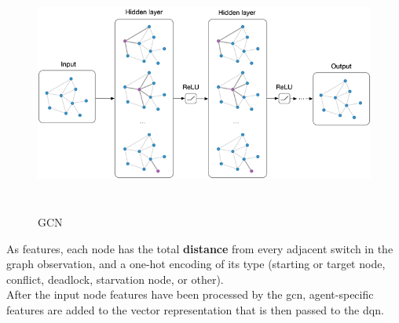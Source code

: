 \begin{figure}[H] 
\includegraphics[height=80mm, width=140mm, scale=0.5]{chapters/gcn.png}
\centering
\caption{GCN}
\label{fig:s5} 
\end{figure}
\noindent
As features, each node has the total \textbf{distance} from every adjacent switch in the graph observation, and a one-hot encoding of its type (starting or target node, conflict, deadlock, starvation node, or other). \\
After the input node features have been processed by the gcn, agent-specific features are added to the vector representation that is then passed to the dqn.
